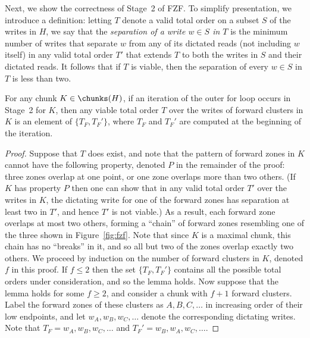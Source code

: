 \medskip
Next, we show the correctness of Stage~2 of FZF.
To simplify presentation, we introduce a definition:
letting $T$ denote a valid total order on a subset $S$ of the writes in $H$, we say that 
the \emph{separation of a write $w \in S$ in $T$} is the minimum number of writes
that separate $w$ from any of its dictated reads (not including $w$ itself) in any valid total order $T'$ that
extends $T$ to both the writes in $S$ and their dictated reads.
It follows that if $T$ is viable, then the separation of every $w \in S$ in $T$
is less than two.

\begin{lemma}
\label{lemma:fzf-stage2-a}
For any chunk $K \in \chunks(H)$, if an iteration of the outer for loop occurs in Stage~2 for $K$, then
any viable total order $T$ over the writes of forward clusters in $K$ is an element
of $\{T_F, T_F'\}$, where $T_F$ and $T_F'$ are computed at the beginning of the iteration.
\begin{proof}
Suppose that $T$ does exist, and note that the pattern of forward zones in $K$
cannot have the following property, denoted $P$ in the remainder of the proof:
three zones overlap at one point, or one zone overlaps more than two others.
(If $K$ has property $P$ then one can show that in any valid total order $T'$ over the writes in $K$,
 the dictating write for one of the forward zones has separation at least two in $T'$, and hence $T'$ is not viable.)
As a result, each forward zone overlaps at most two others, forming a ``chain''
of forward zones resembling one of the three shown in Figure~\ref{fig:fzf}.
Note that since $K$ is a maximal chunk, this chain has no ``breaks'' in it,
and so all but two of the zones overlap exactly two others.
We proceed by induction on the number of forward clusters in $K$, denoted $f$ in this proof.
If $f \leq 2$ then the set $\{T_F, T_F'\}$ contains all the possible total orders under consideration,
and so the lemma holds.
Now suppose that the lemma holds for some $f \geq 2$, and consider a chunk with $f+1$ forward clusters.
Label the forward zones of these clusters as $A, B, C, \ldots$ in increasing order of their low endpoints,
and let $w_A, w_B, w_C, \ldots$ denote the corresponding dictating writes.
Note that $T_F = w_A, w_B, w_C, \ldots$ and $T_F' = w_B, w_A, w_C, \ldots$.


\end{proof}
\end{lemma}
